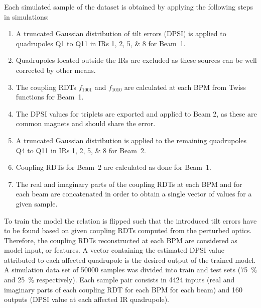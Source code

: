 
Each simulated sample of the dataset is obtained by applying the following steps in simulations:
\begin{enumerate}
    \item A truncated Gaussian distribution of tilt errors (\(\mathrm{DPSI}\)) is applied to quadrupoles Q\num{1} to Q\num{11} in IRs \numlist{1;2;5;8} for Beam~\num{1}.
    \item Quadrupoles located outside the IRs are excluded as these sources can be well corrected by other means.
    \item The coupling RDTs \(f_{1001}\) and \(f_{1010}\) are calculated at each BPM from Twiss functions for Beam~\num{1}.
    \item The \(\mathrm{DPSI}\) values for triplets are exported and applied to Beam 2, as these are common magnets and should share the error.
    \item A truncated Gaussian distribution is applied to the remaining quadrupoles Q\num{4} to Q\num{11} in IRs \numlist{1;2;5;8} for Beam~\num{2}.
    \item Coupling RDTs for Beam~\num{2} are calculated as done for Beam~\num{1}.
    \item The real and imaginary parts of the coupling RDTs at each BPM and for each beam are concatenated in order to obtain a single vector of values for a given sample.
\end{enumerate}

To train the model the relation is flipped such that the introduced tilt errors have to be found based on given coupling RDTs computed from the perturbed optics.
Therefore, the coupling RDTs reconstructed at each BPM are considered as model input, or features.
A vector containing the estimated \(\mathrm{DPSI}\) value attributed to each affected quadrupole is the desired output of the trained model.
A simulation data set of \num{50000} samples was divided into train and test sets (\qty{75}{\percent} and \qty{25}{\percent} respectively).
Each sample pair consists in \num{4424} inputs (real and imaginary parts of each coupling RDT for each BPM for each beam) and \num{160} outputs (\(\mathrm{DPSI}\) value at each affected IR quadrupole).

